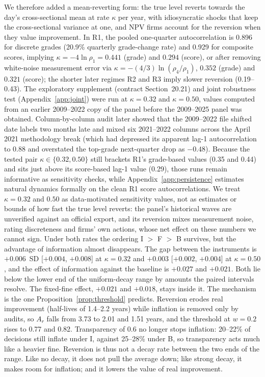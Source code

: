 \documentclass[11pt]{article}
\begin{document}
We therefore added a mean-reverting form: the true level reverts towards the day's cross-sectional mean at rate $\kappa$ per year, with idiosyncratic shocks that keep the cross-sectional variance at one, and NPV firms account for the reversion when they value improvement. In R1, the pooled one-quarter autocorrelation is 0.896 for discrete grades (20.9\% quarterly grade-change rate) and 0.929 for composite scores, implying $\kappa = -4\ln\rho_1 = 0.441$ (grade) and $0.294$ (score), or after removing white-noise measurement error via $\kappa = -(4/3)\ln(\rho_4/\rho_1)$, $0.352$ (grade) and $0.321$ (score); the shorter later regimes R2 and R3 imply slower reversion (0.19--0.43). The exploratory supplement (contract Section~20.21) and joint robustness test (Appendix~\ref{app:joint}) were run at $\kappa = 0.32$ and $\kappa = 0.50$, values computed from an earlier 2009--2022 copy of the panel before the 2009--2025 panel was obtained. Column-by-column audit later showed that the 2009--2022 file shifted date labels two months late and mixed six 2021--2022 columns across the April 2021 methodology break (which had depressed its apparent lag-1 autocorrelation to 0.88 and overstated the top-grade next-quarter drop as $-0.48$). Because the tested pair $\kappa \in \{0.32, 0.50\}$ still brackets R1's grade-based values (0.35 and 0.44) and sits just above its score-based lag-1 value (0.29), those runs remain informative as sensitivity checks, while Appendix~\ref{app:persistence} estimates natural dynamics formally on the clean R1 score autocorrelations. We treat $\kappa = 0.32$ and $0.50$ as data-motivated sensitivity values, not as estimates or bounds of how fast the true level reverts: the panel's historical waves are unverified against an official export, and its reversion mixes measurement noise, rating discreteness and firms' own actions, whose net effect on these numbers we cannot sign. Under both rates the ordering I $>$ F $>$ B survives, but the advantage of information almost disappears. The gap between the instruments is $+0.006$~SD [$+0.004$, $+0.008$] at $\kappa = 0.32$ and $+0.003$ [$+0.002$, $+0.004$] at $\kappa = 0.50$, and the effect of information against the baseline is $+0.027$ and $+0.021$. Both lie below the lower end of the uniform-decay range by amounts the paired intervals resolve. The fixed-fine effect, $+0.021$ and $+0.018$, stays inside it. The mechanism is the one Proposition~\ref{prop:threshold} predicts. Reversion erodes real improvement (half-lives of 1.4--2.2 years) while inflation is removed only by audits, so $A_r$ falls from 3.73 to 2.01 and 1.51 years, and the threshold at $w = 0.2$ rises to 0.77 and 0.82. Transparency of 0.6 no longer stops inflation: 20--22\% of decisions still inflate under I, against 25--28\% under B, so transparency acts much like a heavier fine. Reversion is thus not a decay rate between the two ends of the range. Like no decay, it does not pull the average down; like strong decay, it makes room for inflation; and it lowers the value of real improvement.
\end{document}

